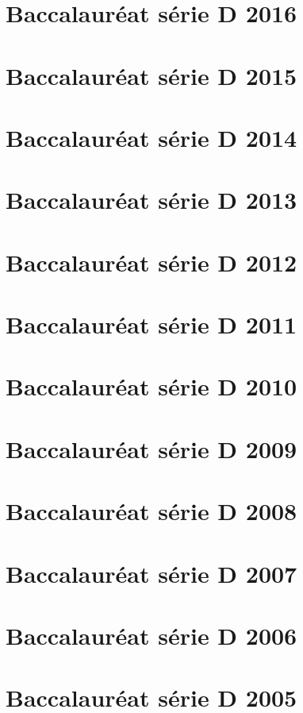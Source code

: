 \section{Baccalauréat série D 2016}

\newpage
\section{Baccalauréat série D 2015}

\newpage
\section{Baccalauréat série D 2014}

\newpage
\section{Baccalauréat série D 2013}

\newpage
\section{Baccalauréat série D 2012}

\newpage
\section{Baccalauréat série D 2011}

\newpage
\section{Baccalauréat série D 2010}

\newpage
\section{Baccalauréat série D 2009}

\newpage
\section{Baccalauréat série D 2008}

\newpage
\section{Baccalauréat série D 2007}

\newpage
\section{Baccalauréat série D 2006}

\newpage
\section{Baccalauréat série D 2005}

\newpage
